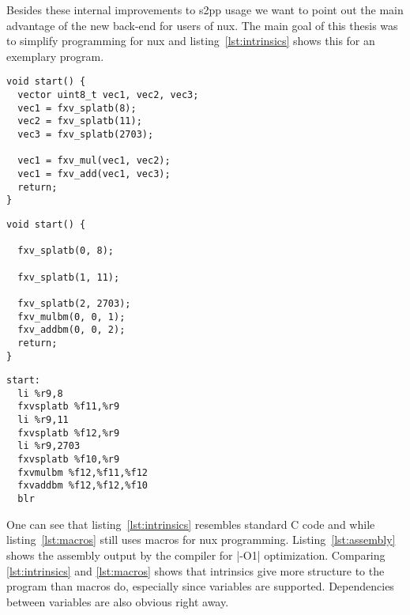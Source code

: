 Besides these internal improvements to \ac{s2pp} usage we want to point out the main advantage of the new back-end for users of nux.
The main goal of this thesis was to simplify programming for nux and listing~\ref{lst:intrinsics} shows this for an exemplary program.
\begin{adjustbox}{center, width=1.1\textwidth}
\lstset{numbers=none}
    \begin{minipage}[t]{.4\textwidth}
    \begin{lstlisting}[caption={Code with Intrinsics}, label=lst:intrinsics]
void start() {
  vector uint8_t vec1, vec2, vec3;
  vec1 = fxv_splatb(8);	
  vec2 = fxv_splatb(11);	
  vec3 = fxv_splatb(2703);	
  
  vec1 = fxv_mul(vec1, vec2);
  vec1 = fxv_add(vec1, vec3);
  return;
} 
\end{lstlisting}
\end{minipage}
\begin{minipage}[t]{.3\textwidth}
\begin{lstlisting}[caption={Code With Macros}, label=lst:macros]
void start() {

  fxv_splatb(0, 8);

  fxv_splatb(1, 11);

  fxv_splatb(2, 2703);
  fxv_mulbm(0, 0, 1);
  fxv_addbm(0, 0, 2);
  return;
} 
\end{lstlisting}
\end{minipage}\begin{minipage}[t]{.4\textwidth}
    \begin{lstlisting}[caption={Assembly Output for \ref{lst:intrinsics}}, label=lst:assembly]
start:
  li %r9,8
  fxvsplatb %f11,%r9
  li %r9,11
  fxvsplatb %f12,%r9
  li %r9,2703	
  fxvsplatb %f10,%r9
  fxvmulbm %f12,%f11,%f12	
  fxvaddbm %f12,%f12,%f10
  blr
\end{lstlisting}
\end{minipage}
\end{adjustbox}

One can see that listing~\ref{lst:intrinsics} resembles standard C code and while listing~\ref{lst:macros} still uses macros for nux programming.
Listing~\ref{lst:assembly} shows the assembly output by the compiler for |-O1| optimization.
Comparing \ref{lst:intrinsics} and \ref{lst:macros} shows that intrinsics give more structure to the program than macros do, especially since variables are supported.
Dependencies between variables are also obvious right away.

